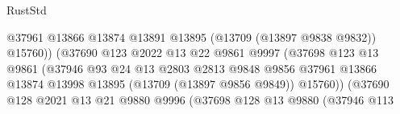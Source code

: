 \begin{lexlean}{RustStd}
\begin{coremodule}
                                                  @37961
                                                  @13866
                                                  @13874
                                                  @13891
                                                  @13895
                                                  (@13709 (@13897 @9838 @9832))
                                                  @15760))
                                              (@37690
                                                @123
                                                @2022
                                                @13
                                                @22
                                                @9861
                                                @9997
                                                (@37698
                                                  @123
                                                  @13
                                                  @9861
                                                  (@37946
                                                    @93
                                                    @24
                                                    @13
                                                    @2803
                                                    @2813
                                                    @9848
                                                    @9856
                                                    @37961
                                                    @13866
                                                    @13874
                                                    @13998
                                                    @13895
                                                    (@13709 (@13897 @9856 @9849))
                                                    @15760))
                                                (@37690
                                                  @128
                                                  @2021
                                                  @13
                                                  @21
                                                  @9880
                                                  @9996
                                                  (@37698
                                                    @128
                                                    @13
                                                    @9880
                                                    (@37946
                                                      @113

\end{coremodule}
\end{lexlean}
